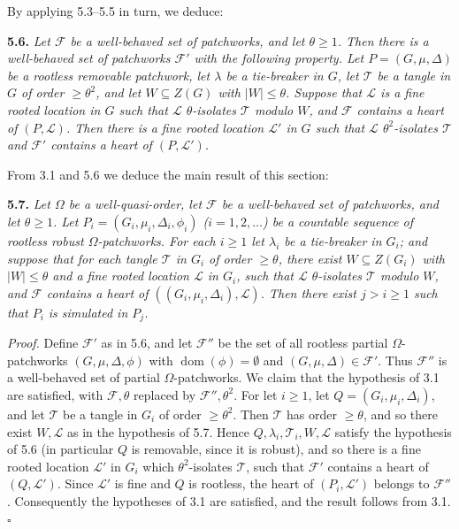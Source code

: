 By applying 5.3--5.5 in turn, we deduce:

\textbf{5.6.} \textit{Let $\mathcal{F}$ be a well-behaved set of patchworks, and let $\theta \ge 1$. Then there is a well-behaved set of patchworks $\mathcal{F}'$ with the following property. Let $P = (G, \mu, \Delta)$ be a rootless removable patchwork, let $\lambda$ be a tie-breaker in $G$, let $\mathcal{T}$ be a tangle in $G$ of order $\ge \theta^2$, and let $W \subseteq Z(G)$ with $|W| \le \theta$. Suppose that $\mathcal{L}$ is a fine rooted location in $G$ such that $\mathcal{L}$ $\theta$-isolates $\mathcal{T}$ modulo $W$, and $\mathcal{F}$ contains a heart of $(P, \mathcal{L})$. Then there is a fine rooted location $\mathcal{L}'$ in $G$ such that $\mathcal{L}$ $\theta^2$-isolates $\mathcal{T}$ and $\mathcal{F}'$ contains a heart of $(P, \mathcal{L}')$.}

From 3.1 and 5.6 we deduce the main result of this section:

\textbf{5.7.} \textit{Let $\Omega$ be a well-quasi-order, let $\mathcal{F}$ be a well-behaved set of patchworks, and let $\theta \ge 1$. Let $P_i = (G_i, \mu_i, \Delta_i, \phi_i)$ ($i = 1, 2, \dots$) be a countable sequence of rootless robust $\Omega$-patchworks. For each $i \ge 1$ let $\lambda_i$ be a tie-breaker in $G_i$; and suppose that for each tangle $\mathcal{T}$ in $G_i$ of order $\ge \theta$, there exist $W \subseteq Z(G_i)$ with $|W| \le \theta$ and a fine rooted location $\mathcal{L}$ in $G_i$, such that $\mathcal{L}$ $\theta$-isolates $\mathcal{T}$ modulo $W$, and $\mathcal{F}$ contains a heart of $((G_i, \mu_i, \Delta_i), \mathcal{L})$. Then there exist $j > i \ge 1$ such that $P_i$ is simulated in $P_j$.}

\textit{Proof.} Define $\mathcal{F}'$ as in 5.6, and let $\mathcal{F}''$ be the set of all rootless partial $\Omega$-patchworks $(G, \mu, \Delta, \phi)$ with $\operatorname{dom}(\phi) = \emptyset$ and $(G, \mu, \Delta) \in \mathcal{F}'$. Thus $\mathcal{F}''$ is a well-behaved set of partial $\Omega$-patchworks. We claim that the hypothesis of 3.1 are satisfied, with $\mathcal{F}, \theta$ replaced by $\mathcal{F}'', \theta^2$. For let $i \ge 1$, let $Q = (G_i, \mu_i, \Delta_i)$, and let $\mathcal{T}$ be a tangle in $G_i$ of order $\ge \theta^2$. Then $\mathcal{T}$ has order $\ge \theta$, and so there exist $W, \mathcal{L}$ as in the hypothesis of 5.7. Hence $Q, \lambda_i, \mathcal{T}_i, W, \mathcal{L}$ satisfy the hypothesis of 5.6 (in particular $Q$ is removable, since it is robust), and so there is a fine rooted location $\mathcal{L}'$ in $G_i$ which $\theta^2$-isolates $\mathcal{T}$, such that $\mathcal{F}'$ contains a heart of $(Q, \mathcal{L}')$. Since $\mathcal{L}'$ is fine and $Q$ is rootless, the heart of $(P_i, \mathcal{L}')$ belongs to $\mathcal{F}''$. Consequently the hypotheses of 3.1 are satisfied, and the result follows from 3.1. $\square$

